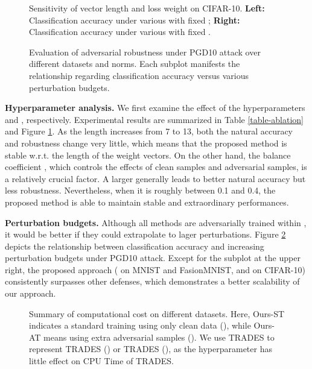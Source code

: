 \documentclass[preprint,review,12pt]{elsarticle}
\numberwithin{equation}{section}
\begin{document}
\begin{figure}[htb]
	\centering
	\caption{Sensitivity of vector length  and  loss weight  on CIFAR-10.
		\textbf{Left:} Classification accuracy under various  with fixed ;
		\textbf{Right:} Classification accuracy under various   with fixed .}
	\label{fig-ablation}
\end{figure}

\begin{figure}[htb]
	\centering
	\caption{Evaluation of adversarial robustness under PGD10 attack over different datasets and norms.
	Each subplot manifests the relationship regarding classification accuracy versus various perturbation budgets.
	}
	\label{fig-dea}
\end{figure}



\textbf{Hyperparameter analysis.} We first examine the effect of the hyperparameters  and , respectively.
Experimental results are summarized in Table \ref{table-ablation} and Figure \ref{fig-ablation}.
As the length  increases from 7 to 13,
both the natural accuracy and robustness change very little,
which means that the proposed method is stable w.r.t. the length of the weight vectors.
On the other hand, the balance coefficient ,  which controls the effects of clean samples and adversarial samples, is a relatively crucial factor.
A larger  generally leads to better natural accuracy but less robustness.
Nevertheless, when it is roughly between 0.1 and 0.4,
the proposed method is able to maintain stable and extraordinary performances.

\textbf{Perturbation budgets.}
Although all methods are adversarially trained within ,
it would be better if they could extrapolate to lager perturbations.
Figure \ref{fig-dea} depicts the relationship between classification accuracy and increasing perturbation budgets under PGD10 attack.
Except for the subplot at the upper right,
the proposed approach ( on MNIST and FasionMNIST, and  on CIFAR-10) consistently surpasses other defenses,
which demonstrates a better scalability of our approach.

\begin{figure}[htb]
	\centering
	\caption{Summary of computational cost on different datasets.
    Here, Ours-ST indicates a standard training using only clean data (),
	while Ours-AT  means using extra adversarial samples  ().
    We use TRADES to represent TRADES () or TRADES (),
	as the hyperparameter  has little effect on CPU Time of TRADES.	
	}
	\label{fig-cputime}
\end{figure}
\end{document}
